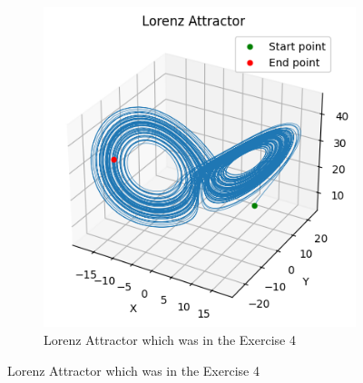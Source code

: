 \begin{figure}[H]

    \begin{subfigure}{0.45\textwidth}
        \includegraphics[width=\linewidth]{images/task4_lorenz.png}
        \caption{Lorenz Attractor which was in the Exercise 4}
        \label{task4_3}
    \end{subfigure}
    \centering


\end{figure}
